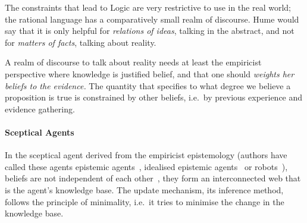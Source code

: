 The constraints that lead to Logic are very restrictive to use in the real world; the rational language has a comparatively small realm of discourse. Hume would say that it is only helpful for \emph{relations of ideas}, talking in the abstract, and not for \emph{matters of facts}, talking about reality.

A realm of discourse to talk about reality needs at least the empiricist perspective where knowledge is justified belief, and that one should \emph{weights her beliefs to the evidence.} The quantity that specifies to what degree we believe a proposition is true is constrained by other beliefs, i.e.\ by previous experience and evidence gathering.

\paragraph{Sceptical Agents}\label{sec:sceptical_agent}\label{sec:sceptical_agents} In the sceptical agent derived from the empiricist epistemology
(authors have called these agents epistemic agents~\cite{caticha:2008}, idealised epistemic agents~\cite{sowinski:2016} or robots~\cite{jaynes:2003}), beliefs are not independent of each other~\cite{caticha:2008}, they form an interconnected web that is the agent's knowledge base. The update mechanism, its inference method, follows the principle of minimality, i.e.\ it tries to minimise the change in the knowledge base.

